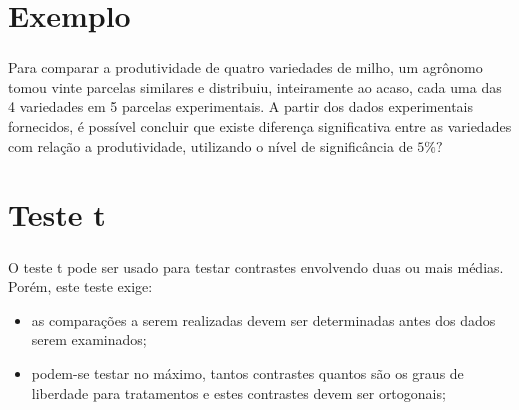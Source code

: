 \documentclass[14pt,aspectratio=1610]{beamer}
\begin{document}
\section{Exemplo}
\begin{frame}{}
\frametitle{}
\begin{block}{}
\justifying
Para comparar a produtividade de quatro variedades de milho, um agrônomo tomou
vinte parcelas similares e distribuiu, inteiramente ao acaso, cada uma das 4 variedades em 5 parcelas experimentais. A partir dos dados experimentais fornecidos, é possível concluir que existe diferença significativa entre as variedades com relação a produtividade, utilizando o nível de significância de $5\%?$
\vspace{-0.5cm}
\begin{table}[!h]
\end{table}
\end{block}
\end{frame}

\section{Teste t}
\begin{frame}{}
\frametitle{}
\begin{block}{}
\justifying
O teste t pode ser usado para testar contrastes envolvendo duas ou mais médias. 
Porém, este teste exige:
\begin{itemize}
\item as comparações a serem realizadas devem ser determinadas antes dos dados serem examinados;
\item podem-se testar no máximo, tantos contrastes quantos são os graus de liberdade para tratamentos e estes contrastes devem ser ortogonais;
\end{itemize}
\end{block}
\end{frame}
\end{document}
